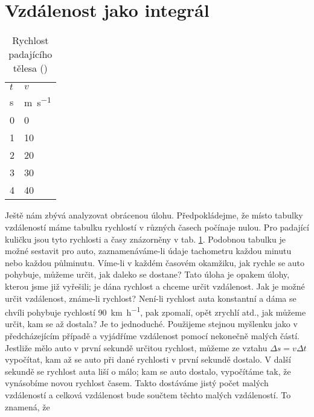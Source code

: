   \section{Vzdálenost jako integrál}
    \begin{table}[ht!]        %
      \centering
      \renewcommand{\arraystretch}{1.0}
      \begin{tabular}{>{\centering\arraybackslash}p{2em}|>{\centering\arraybackslash}p{3em}}
        \hline  \(t\)    & \(v\)          \\
                 \unit{\s} & \unit{\m\per\s}  \\
         \hline  \num{0} & \num{0}        \\
                 \num{1} & \num{10}       \\
                 \num{2} & \num{20}       \\
                 \num{3} & \num{30}       \\
                 \num{4} & \num{40}       \\
        \hline 
      \end{tabular}
      \caption{Rychlost padajícího tělesa (\cite[s.~115]{Feynman01})}
      \label{fyz:tab004}
    \end{table}
    Ještě nám zbývá analyzovat obrácenou úlohu. Předpokládejme, že místo tabulky vzdáleností máme 
    tabulku rychlostí v různých časech počínaje nulou. Pro padající kuličku jsou tyto rychlosti a 
    časy znázorněny v tab. \ref{fyz:tab004}. Podobnou tabulku je možné sestavit pro auto, 
    zaznamenáváme-li údaje tachometru každou minutu nebo každou půlminutu. Víme-li v každém časovém 
    okamžiku, jak rychle se auto pohybuje, můžeme určit, jak daleko se dostane? Tato úloha je 
    opakem úlohy, kterou jsme již vyřešili; je dána rychlost a chceme určit vzdálenost. Jak je 
    možné určit vzdálenost, známe-li rychlost? Není-li rychlost auta konstantní a dáma se chvíli 
    pohybuje rychlostí \qty{90}{\km\per\hour}, pak zpomalí, opět zrychlí atd., jak můžeme určit, kam 
    se až dostala? Je to jednoduché. Použijeme stejnou myšlenku jako v předcházejícím případě a 
    vyjádříme vzdálenost pomocí nekonečně malých částí. Jestliže mělo auto v první sekundě určitou 
    rychlost, můžeme ze vztahu \(\Delta s = v\Delta t\) vypočítat, kam až se auto při dané 
    rychlosti v první sekundě dostalo. V další sekundě se rychlost auta liší o málo; kam se auto 
    dostalo, vypočítáme tak, že vynásobíme novou rychlost časem. Takto dostáváme jistý počet malých 
    vzdáleností a celková vzdálenost bude součtem těchto malých vzdáleností. To znamená, že 
